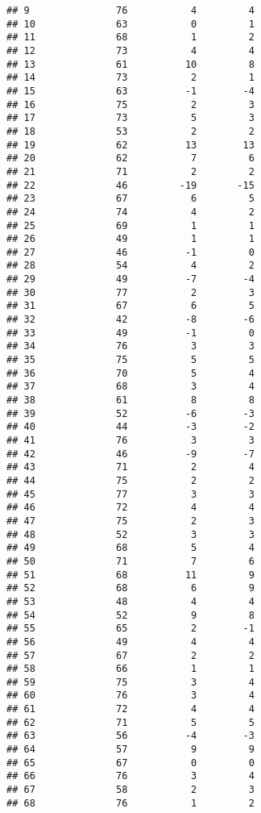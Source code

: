 \documentclass[]{article}
\begin{document}
\begin{verbatim}
## 9               76           4         4
## 10              63           0         1
## 11              68           1         2
## 12              73           4         4
## 13              61          10         8
## 14              73           2         1
## 15              63          -1        -4
## 16              75           2         3
## 17              73           5         3
## 18              53           2         2
## 19              62          13        13
## 20              62           7         6
## 21              71           2         2
## 22              46         -19       -15
## 23              67           6         5
## 24              74           4         2
## 25              69           1         1
## 26              49           1         1
## 27              46          -1         0
## 28              54           4         2
## 29              49          -7        -4
## 30              77           2         3
## 31              67           6         5
## 32              42          -8        -6
## 33              49          -1         0
## 34              76           3         3
## 35              75           5         5
## 36              70           5         4
## 37              68           3         4
## 38              61           8         8
## 39              52          -6        -3
## 40              44          -3        -2
## 41              76           3         3
## 42              46          -9        -7
## 43              71           2         4
## 44              75           2         2
## 45              77           3         3
## 46              72           4         4
## 47              75           2         3
## 48              52           3         3
## 49              68           5         4
## 50              71           7         6
## 51              68          11         9
## 52              68           6         9
## 53              48           4         4
## 54              52           9         8
## 55              65           2        -1
## 56              49           4         4
## 57              67           2         2
## 58              66           1         1
## 59              75           3         4
## 60              76           3         4
## 61              72           4         4
## 62              71           5         5
## 63              56          -4        -3
## 64              57           9         9
## 65              67           0         0
## 66              76           3         4
## 67              58           2         3
## 68              76           1         2

\end{verbatim}
\end{document}
